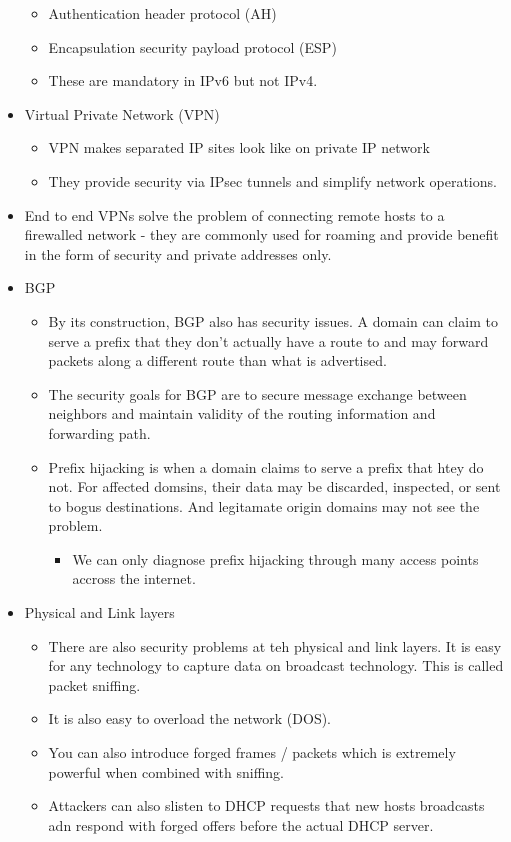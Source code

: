 \begin{itemize}
  \begin{itemize}
  \tightlist
  \item
    Authentication header protocol (AH)
  \item
    Encapsulation security payload protocol (ESP)
  \item
    These are mandatory in IPv6 but not IPv4.
  \end{itemize}
\item
  Virtual Private Network (VPN)

  \begin{itemize}
  \tightlist
  \item
    VPN makes separated IP sites look like on private IP network
  \item
    They provide security via IPsec tunnels and simplify network
    operations.
  \end{itemize}
\item
  End to end VPNs solve the problem of connecting remote hosts to a
  firewalled network - they are commonly used for roaming and provide
  benefit in the form of security and private addresses only.
\item
  BGP

  \begin{itemize}
  \tightlist
  \item
    By its construction, BGP also has security issues. A domain can
    claim to serve a prefix that they don't actually have a route to and
    may forward packets along a different route than what is advertised.
  \item
    The security goals for BGP are to secure message exchange between
    neighbors and maintain validity of the routing information and
    forwarding path.
  \item
    Prefix hijacking is when a domain claims to serve a prefix that htey
    do not. For affected domsins, their data may be discarded,
    inspected, or sent to bogus destinations. And legitamate origin
    domains may not see the problem.

    \begin{itemize}
    \tightlist
    \item
      We can only diagnose prefix hijacking through many access points
      accross the internet.
    \end{itemize}
  \end{itemize}
\item
  Physical and Link layers

  \begin{itemize}
  \tightlist
  \item
    There are also security problems at teh physical and link layers. It
    is easy for any technology to capture data on broadcast technology.
    This is called packet sniffing.
  \item
    It is also easy to overload the network (DOS).
  \item
    You can also introduce forged frames / packets which is extremely
    powerful when combined with sniffing.
  \item
    Attackers can also slisten to DHCP requests that new hosts
    broadcasts adn respond with forged offers before the actual DHCP
    server.


\end{itemize}
\end{itemize}
